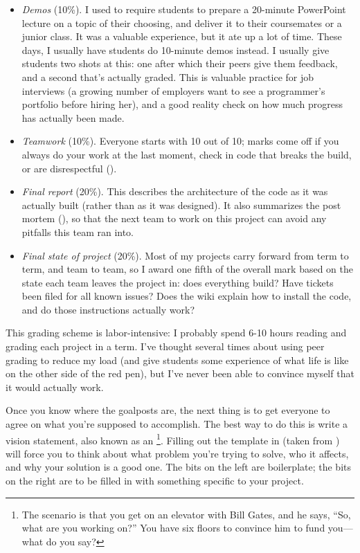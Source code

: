 \documentclass{report}
\begin{document}
\begin{itemize}
  \item \emph{Demos} (10\%).  I used to require students to prepare a
  20-minute PowerPoint lecture on a topic of their choosing, and
  deliver it to their coursemates or a junior class.  It was a
  valuable experience, but it ate up a lot of time.  These days, I
  usually have students do 10-minute demos instead.  I usually give
  students two shots at this: one after which their peers give them
  feedback, and a second that's actually graded.  This is valuable
  practice for job interviews (a growing number of employers want to
  see a programmer's portfolio before hiring her), and a good reality
  check on how much progress has actually been made.

  \item \emph{Teamwork} (10\%).  Everyone starts with 10 out of 10;
  marks come off if you always do your work at the last moment, check
  in code that breaks the build, or are disrespectful
  ().

  \item \emph{Final report} (20\%).  This describes the architecture
  of the code as it was actually built (rather than as it was
  designed).  It also summarizes the post mortem
  (), so that the next team to work on
  this project can avoid any pitfalls this team ran into.

  \item \emph{Final state of project} (20\%).  Most of my projects
  carry forward from term to term, and team to team, so I award one
  fifth of the overall mark based on the state each team leaves the
  project in: does everything build?  Have tickets been filed for all
  known issues?  Does the wiki explain how to install the code, and do
  those instructions actually work?

\end{itemize}

This grading scheme is labor-intensive: I probably spend 6-10 hours
reading and grading each project in a term.  I've thought several
times about using peer grading to reduce my load (and give students
some experience of what life is like on the other side of the red
pen), but I've never been able to convince myself that it would
actually work.


Once you know where the goalposts are, the next thing is to get
everyone to agree on what you're supposed to accomplish.  The best way
to do this is write a vision statement, also known as an
\footnote{The scenario is that you get on an
elevator with Bill Gates, and he says, ``So, what are you working
on?''  You have six floors to convince him to fund you---what do you
say?}.  Filling out the template in  (taken from
\cite{b:pollice-small-teams-rup}) will force you to think about what
problem you're trying to solve, who it affects, and why your solution
is a good one.  The bits on the left are boilerplate; the bits on the
right are to be filled in with something specific to your project.
\end{document}
